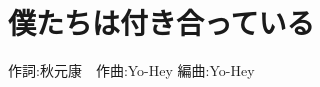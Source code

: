 \section{僕たちは付き合っている}

\begin{center}
    \scriptsize{
        作詞:秋元康　作曲:Yo-Hey	編曲:Yo-Hey
    }
\end{center}

\vspace{0.7em}

\begin{Parallel}[c]{0.47\textwidth}{0.47\textwidth}

\ParallelLText{
    \footnotesize{
        
    }
}

\ParallelRText{
    \footnotesize{
        
    }
}

\end{Parallel}
